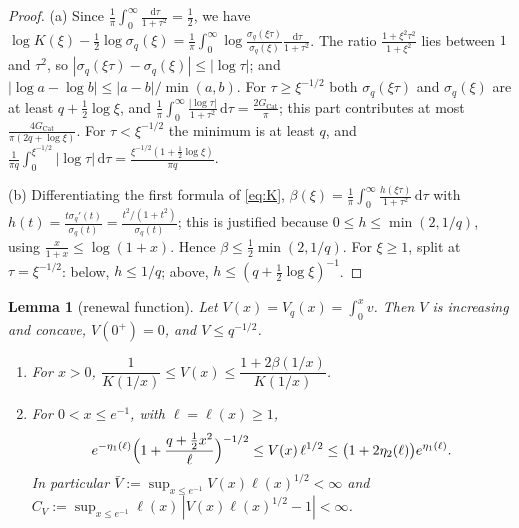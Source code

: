 \documentclass[11pt]{amsart}
\newcommand{\dd}{\,\mathrm{d}}
\newtheorem{lemma}[theorem]{Lemma}
\theoremstyle{definition}
\theoremstyle{remark}
\numberwithin{equation}{section}
\begin{document}
\begin{proof}
(a) Since $\frac1\pi\int_0^\infty\frac{\dd\tau}{1+\tau^2}=\frac12$, we have $\log K(\xi)-\frac12\log\sigma_q(\xi)=\frac1\pi\int_0^\infty\log\frac{\sigma_q(\xi\tau)}{\sigma_q(\xi)}\frac{\dd\tau}{1+\tau^2}$. The ratio $\frac{1+\xi^2\tau^2}{1+\xi^2}$ lies between $1$ and $\tau^2$, so $|\sigma_q(\xi\tau)-\sigma_q(\xi)|\le|\log\tau|$; and $|\log a-\log b|\le|a-b|/\min(a,b)$. For $\tau\ge\xi^{-1/2}$ both $\sigma_q(\xi\tau)$ and $\sigma_q(\xi)$ are at least $q+\frac12\log\xi$, and $\frac1\pi\int_0^\infty\frac{|\log\tau|}{1+\tau^2}\dd\tau=\frac{2G_{\mathrm{Cat}}}\pi$; this part contributes at most $\frac{4G_{\mathrm{Cat}}}{\pi(2q+\log\xi)}$. For $\tau<\xi^{-1/2}$ the minimum is at least $q$, and $\frac1{\pi q}\int_0^{\xi^{-1/2}}|\log\tau|\dd\tau=\frac{\xi^{-1/2}(1+\frac12\log\xi)}{\pi q}$.

(b) Differentiating the first formula of \eqref{eq:K}, $\beta(\xi)=\frac1\pi\int_0^\infty\frac{h(\xi\tau)}{1+\tau^2}\dd\tau$ with $h(t)=\frac{t\sigma_q'(t)}{\sigma_q(t)}=\frac{t^2/(1+t^2)}{\sigma_q(t)}$; this is justified because $0\le h\le\min(2,1/q)$, using $\frac{x}{1+x}\le\log(1+x)$. Hence $\beta\le\frac12\min(2,1/q)$. For $\xi\ge1$, split at $\tau=\xi^{-1/2}$: below, $h\le1/q$; above, $h\le(q+\frac12\log\xi)^{-1}$.
\end{proof}

\begin{lemma}[renewal function]\label{lem:V}
Let $V(x)=V_q(x)=\int_0^xv$. Then $V$ is increasing and concave, $V(0^+)=0$, and $V\le q^{-1/2}$.
\begin{enumerate}
\item[(a)] For $x>0$, $\dfrac1{K(1/x)}\le V(x)\le\dfrac{1+2\beta(1/x)}{K(1/x)}$.
\item[(b)] For $0<x\le e^{-1}$, with $\ell=\ell(x)\ge1$,
\[
e^{-\eta_1(\ell)}\Bigl(1+\frac{q+\frac12x^2}{\ell}\Bigr)^{-1/2}\le V(x)\,\ell^{1/2}\le\bigl(1+2\eta_2(\ell)\bigr)e^{\eta_1(\ell)} .
\]
In particular $\bar V:=\sup_{x\le e^{-1}}V(x)\ell(x)^{1/2}<\infty$ and $C_V:=\sup_{x\le e^{-1}}\ell(x)\,|V(x)\ell(x)^{1/2}-1|<\infty$.
\end{enumerate}
\end{lemma}
\end{document}
